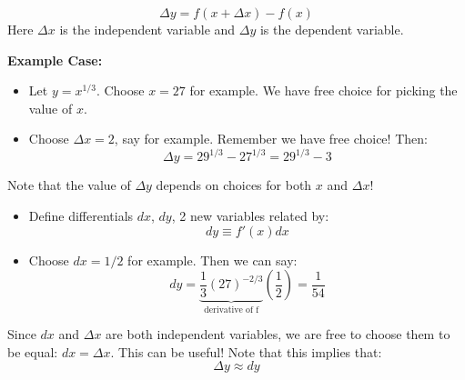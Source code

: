 \begin{itemize}
\begin{multicols}{2}
\begin{itemize}
        \begin{equation}
            \Delta y = f(x+\Delta x)-f(x)
            \label{eq:}
        \end{equation}
        Here $\Delta x$ is the independent variable and $\Delta y$ is the dependent variable.
    \end{itemize}
    \vfill\null
    \columnbreak
    \textbf{Example Case:}
    \begin{itemize}
        \item Let $y=x^{1/3}$. Choose $x=27$ for example. We have free choice for picking the value of $x$.
        \item Choose $\Delta x=2$, say for example. Remember we have free choice! Then:
        \begin{equation}
            \Delta y = 29^{1/3}-27^{1/3}=29^{1/3}-3
            \label{eq:}
        \end{equation}
    \end{itemize}
\end{multicols}
\begin{idea}
    Note that the value of $\Delta y$ depends on choices for both $x$ and $\Delta x$!
\end{idea}
\begin{multicols}{2}
    \begin{itemize}
        \item Define differentials $dx$, $dy$, 2 new variables related by:
        \begin{equation}
            dy \equiv f'(x) dx
            \label{eq:}
        \end{equation}
    \end{itemize}
    \vfill\null
    \columnbreak
    \begin{itemize}
        \item Choose $dx=1/2$ for example. Then we can say:
        \begin{equation}
            dy=\underbrace{\frac{1}{3}(27)^{-2/3}}_\text{derivative of f}\left(\frac{1}{2}\right)=\frac{1}{54}
            \label{eq:}
        \end{equation}
    \end{itemize}
\end{multicols}
\begin{idea}
    Since $dx$ and $\Delta x$ are both independent variables, we are free to choose them to be equal: $dx=\Delta x$. This can be useful! Note that this implies that:
    \begin{equation}
        \Delta y \approx dy

\end{equation}
\end{idea}
\end{itemize}
